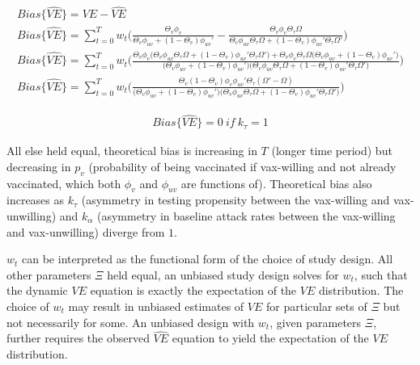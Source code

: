 \documentclass[12pt]{article}
\begin{document}
\begin{scriptsize}
	\begin{eqnarray}
		{Bias}\{\widehat{VE}\} = VE - \widehat{VE} \\
		{Bias}\{\widehat{VE}\} = \sum_{t=0}^{T} w_{t} \bigg( \frac{\Theta_{v}\phi_v}{\Theta_{v}\phi_{uv} + (1 - \Theta_{v}) \phi_{uv}' } - \frac{\Theta_{v}\phi_v\Theta_{\tau}\Omega}{\Theta_{v}\phi_{uv}\Theta_{\tau}\Omega + (1 - \Theta_{v}) \phi_{uv}' \Theta_{\tau}\Omega'} \bigg) \\ 
		{Bias}\{\widehat{VE}\} = \sum_{t=0}^{T} w_{t} \bigg(  \frac{\Theta_{v}\phi_v \big( \Theta_{v}\phi_{uv}\Theta_{\tau}\Omega + (1 - \Theta_{v}) \phi_{uv}' \Theta_{\tau}\Omega' \big) + \Theta_{v}\phi_v\Theta_{\tau}\Omega \big( \Theta_{v}\phi_{uv} + (1 - \Theta_{v}) \phi_{uv}' \big)}{\big( \Theta_{v}\phi_{uv} + (1 - \Theta_{v}) \phi_{uv}' \big) \big( \Theta_{v}\phi_{uv}\Theta_{\tau}\Omega + (1 - \Theta_{v}) \phi_{uv}' \Theta_{\tau}\Omega' \big)  } \bigg) \\
		{Bias}\{\widehat{VE}\} = \sum_{t=0}^{T} w_{t} \bigg( \frac{\Theta_{v} ( 1 - \Theta_{v} ) \phi_v \phi_{uv}' \Theta_{\tau} ( \Omega' - \Omega ) }{\big( \Theta_{v} \phi_{uv} + (1 - \Theta_{v}) \phi_{uv}'  \big) \big( \Theta_{v} \phi_{uv} \Theta_{\tau} \Omega + ( 1 - \Theta_{v}) \phi_{uv}' \Theta_{\tau} \Omega' \big)} \bigg)
	\end{eqnarray}
\end{scriptsize}
\begin{eqnarray}
	{Bias}\{\widehat{VE}\} = 0 \ if \ k_\tau = 1
\end{eqnarray}

All else held equal, theoretical bias is increasing in $T$ (longer time period) but decreasing in $p_v$ (probability of being vaccinated if vax-willing and not already vaccinated, which both $\phi_v$ and $\phi_{uv}$ are functions of). Theoretical bias also increases as $k_{\tau}$ (asymmetry in testing propensity between the vax-willing and vax-unwilling) and $k_{\alpha}$ (asymmetry in baseline attack rates between the vax-willing and vax-unwilling) diverge from $1$.

$w_t$ can be interpreted as the functional form of the choice of study design. All other parameters $\Xi$ held equal, an unbiased study design solves for $w_t$, such that the dynamic $VE$ equation is exactly the expectation of the $VE$ distribution. The choice of $w_t$ may result in unbiased estimates of $VE$ for particular sets of $\Xi$ but not necessarily for some. An unbiased design with $w_t$, given parameters $\Xi$, further requires the observed $\hat{VE}$ equation to yield the expectation of the $VE$ distribution.
\end{document}
